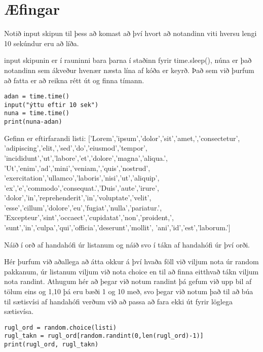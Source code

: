 \newpage
\section{Æfingar}

\begin{exercise}\label{imp1}
Notið input skipun til þess að komast að því hvort að notandinn viti hversu lengi 10 sekúndur eru að líða. 
\end{exercise}
\begin{Answer}[ref={imp1}]
input skipunin er í rauninni bara þarna í staðinn fyrir time.sleep(), núna er það notandinn sem ákveður hvenær næsta lína af kóða er keyrð.
Það sem við þurfum að fatta er að reikna rétt út og finna tímann.
	\begin{lstlisting}
adan = time.time()
input("ýttu eftir 10 sek")
nuna = time.time()
print(nuna-adan)\end{lstlisting}
\end{Answer}


\begin{exercise}\label{imp2}
Gefinn er eftirfarandi listi: 
['Lorem','ipsum','dolor','sit','amet,','consectetur',
'adipiscing','elit,','sed','do','eiusmod','tempor',
'incididunt','ut','labore','et','dolore','magna','aliqua.',
'Ut','enim','ad','mini','veniam,','quis','nostrud',
'exercitation','ullamco','laboris','nisi','ut','aliquip',
'ex','e','commodo','consequat.','Duis','aute','irure',
'dolor','in','reprehenderit','in','voluptate','velit',
'esse','cillum','dolore','eu','fugiat','nulla','pariatur.',
'Excepteur','sint','occaect','cupidatat','non','proident,',
'sunt','in','culpa','qui','officia','deserunt','mollit',
'ani','id','est','laborum.']

Náið í orð af handahófi úr listanum og náið svo í tákn af handahófi úr því orði.
\end{exercise}
\begin{Answer}[ref={imp2}]
Hér þurfum við aðallega að átta okkur á því hvaða föll við viljum nota úr random pakkanum, úr listanum viljum við nota choice en til að finna eitthvað tákn viljum nota randint.
Athugum hér að þegar við notum randint þá gefum við upp bil af tölum eins og 1,10 þá eru bæði 1 og 10 með, svo þegar við notum það til að búa til sætisvísi af handahófi verðum við að passa að fara ekki út fyrir löglega sætisvísa.
	\begin{lstlisting}
rugl_ord = random.choice(listi)
rugl_takn = rugl_ord[random.randint(0,len(rugl_ord)-1)]
print(rugl_ord, rugl_takn)\end{lstlisting}
\end{Answer}